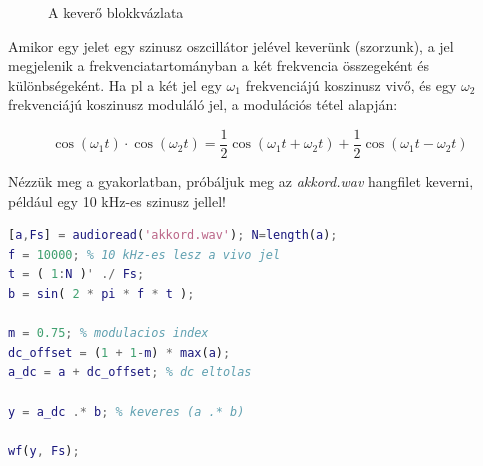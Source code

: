 \documentclass[12pt,a4paper]{article}
\begin{document}
\begin{figure}[H]
\label{fig:keverok}
\centering
{}
\caption{
A keverő blokkvázlata} 
\end{figure}

Amikor egy jelet egy szinusz oszcillátor jelével keverünk (szorzunk), a jel megjelenik a frekvenciatartományban a két frekvencia összegeként és különbségeként. Ha pl a két jel egy $\omega_1$ frekvenciájú koszinusz vivő, és egy $\omega_2$ frekvenciájú koszinusz moduláló jel, a modulációs tétel alapján:

\begin{equation}
\cos(\omega_1t) \cdot \cos(\omega_2t) = \frac{1}{2}\cos(\omega_1t+\omega_2t) +  \frac{1}{2}\cos(\omega_1t - \omega_2t)
\end{equation}

Nézzük meg a gyakorlatban, próbáljuk meg az \textit{akkord.wav} hangfilet keverni, például egy 10 kHz-es szinusz jellel!


\begin{lstlisting}[frame=single,language=matlab,caption=Keverés]
[a,Fs] = audioread('akkord.wav'); N=length(a);
f = 10000; % 10 kHz-es lesz a vivo jel
t = ( 1:N )' ./ Fs;
b = sin( 2 * pi * f * t );

m = 0.75; % modulacios index
dc_offset = (1 + 1-m) * max(a);
a_dc = a + dc_offset; % dc eltolas

y = a_dc .* b; % keveres (a .* b)

wf(y, Fs);
\end{lstlisting}
\end{document}
